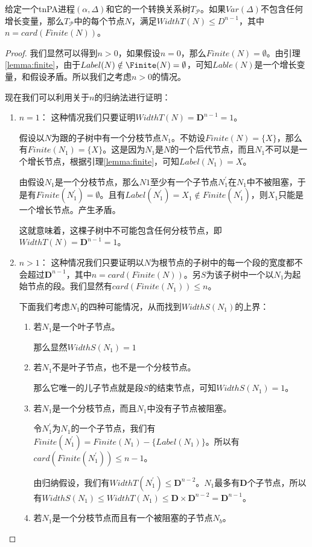 \begin{lem}\label{lemma:width}
给定一个tnPA进程$(\alpha,\Delta)$和它的一个转换关系树$T_{\mathcal{P}}$。如果$Var(\Delta)$不包含任何增长变量，那么$T_{\mathcal{P}}$中的每个节点$N$，满足$WidthT(N)\leq D^{n-1}$，其中 $n=card(Finite(N))$。
\end{lem}

\begin{proof}
我们显然可以得到$n>0$，如果假设$n=0$，那么$Finite(N)=\emptyset$。由引理\ref{lemma:finite}，由于$Label(N)\notin\Finite(N)=\emptyset$，可知$Lable(N)$是一个增长变量，和假设矛盾。所以我们之考虑$n>0$的情况。

现在我们可以利用关于$n$的归纳法进行证明：
\begin{enumerate}
\item $n=1$： 这种情况我们只要证明$WidthT(N)=\mathbf{D}^{n-1}=1$。

假设以$N$为跟的子树中有一个分枝节点$N_1$。不妨设$Finite(N)=\{X\}$，那么有$Finite(N_1)=\{X\}$。这是因为$N_1$是$N$的一个后代节点，而且$N_1$不可以是一个增长节点，根据引理\ref{lemma:finite}，可知$Label(N_1)=X$。

由假设$N_1$是一个分枝节点，那么$N1$至少有一个子节点$N_1^{'}$在$N_1$中不被阻塞，于是有$Finite(N_1^{'})=\emptyset$。且有$Label(N_1^{'})=X_1\notin Finite(N_1^{'})$，则$X_1$只能是一个增长节点。产生矛盾。

这就意味着，这棵子树中不可能包含任何分枝节点，即$WidthT(N)=\mathbf{D}^{n-1}=1$。
\item $n>1$： 这种情况我们只要证明以$N$为根节点的子树中的每一个段的宽度都不会超过$\mathbf{D}^{n-1}$，其中$n=card(Finite(N))$。另$S$为该子树中一个以$N_1$为起始节点的段。我们显然有$card(Finite(N_1))\leq n$。

下面我们考虑$N_1$的四种可能情况，从而找到$WidthS(N_1)$的上界：
\begin{enumerate}
\item 若$N_1$是一个叶子节点。

那么显然$WidthS(N_1)=1$
\item 若$N_1$不是叶子节点，也不是一个分枝节点。

那么它唯一的儿子节点就是段$S$的结束节点，可知$WidthS(N_1)=1$。
\item 若$N_1$是一个分枝节点，而且$N_1$中没有子节点被阻塞。

令$N_1^{'}$为$N_1$的一个子节点，我们有$Finite(N_1^{'})=Finite(N_1)-\{Label(N_1)\}$。所以有$card(Finite(N_1^{'}))\leq n-1$。

由归纳假设，我们有$WidthT(N_1^{'})\leq \mathbf{D}^{n-2}$。$N_1$最多有$\mathbf{D}$个子节点，所以有$WidthS(N_1)\leq WidthT(N_1)\leq \mathbf{D}\times\mathbf{D}^{n-2}=\mathbf{D}^{n-1}$。
\item 若$N_1$是一个分枝节点而且有一个被阻塞的子节点$N_b$。


\end{enumerate}
\end{enumerate}
\end{proof}
